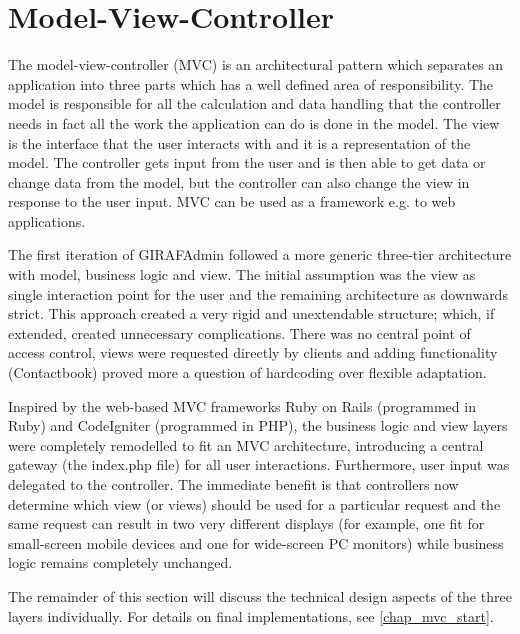 \section{Model-View-Controller}
The model-view-controller (MVC) is an architectural pattern which separates an application into three parts which has a well defined area of responsibility. The model is responsible for all the calculation and data handling that the controller needs in fact all the work the application can do is done in the model. The view is the interface that the user interacts with and it is a representation of the model. The controller gets input from the user and is then able to get data or change data from the model, but the controller can also change the view in response to the user input\cite{vmc}. MVC can be used as a framework e.g. to web applications.

The first iteration of GIRAFAdmin followed a more generic three-tier architecture with model, business logic and view. The initial assumption was the view as single interaction point for the user and the remaining architecture as downwards strict. This approach created a very rigid and unextendable structure; which, if extended, created unnecessary complications. There was no central point of access control, views were requested directly by clients and adding functionality (Contactbook) proved more a question of hardcoding over flexible adaptation.

Inspired by the web-based MVC frameworks Ruby on Rails (programmed in Ruby) and CodeIgniter (programmed in PHP), the business logic and view layers were completely remodelled to fit an MVC architecture, introducing a central gateway (the index.php file) for all user interactions. Furthermore, user input was delegated to the controller. The immediate benefit is that controllers now determine which view (or views) should be used for a particular request and the same request can result in two very different displays (for example, one fit for small-screen mobile devices and one for wide-screen PC monitors) while business logic remains completely unchanged.

The remainder of this section will discuss the technical design aspects of the three layers individually. For details on final implementations, see \vref{chap_mvc_start}.


